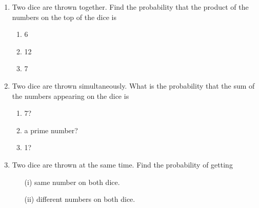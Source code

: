 \begin{enumerate}[label=\thesection.\arabic*,ref=\thesection.\theenumi]
	\item Two dice are thrown together. Find the probability that the product of the numbers
on the top of the dice is
\begin{enumerate}
\item 6
\item 12
\item 7
\end{enumerate}
		\solution
		
  \item Two dice are thrown simultaneously. What is the probability that the sum of the numbers appearing on the dice is 
\begin{enumerate}
\item{7?}
\item{a prime number?}
\item{1?}
\end{enumerate}
\solution

\item Two dice are thrown at the same time. Find the probability of getting
\begin{enumerate}
    \item[(i)] same number on both dice.
    \item[(ii)] different numbers on both dice.
\end{enumerate}

\end{enumerate}
